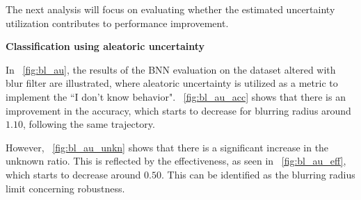 The next analysis will focus on evaluating whether the estimated uncertainty utilization contributes to performance improvement.

\vspace{0.3cm}
\textbf{Classification using aleatoric uncertainty}
\vspace{0.1cm}

In \Fig~\ref{fig:bl_au}, the results of the BNN evaluation on the dataset altered with blur filter are illustrated, where aleatoric uncertainty is utilized as a metric to implement the ``I don't know behavior". \Fig~\ref{fig:bl_au_acc} shows that there is an improvement in the accuracy, which starts to decrease for blurring radius around $1.10$, following the same trajectory.

However, \Fig~\ref{fig:bl_au_unkn} shows that there is a significant increase in the unknown ratio. This is reflected  by the effectiveness, as seen in \Fig~\ref{fig:bl_au_eff}, which starts to decrease around $0.50$. This can be identified as the blurring radius limit concerning robustness.

